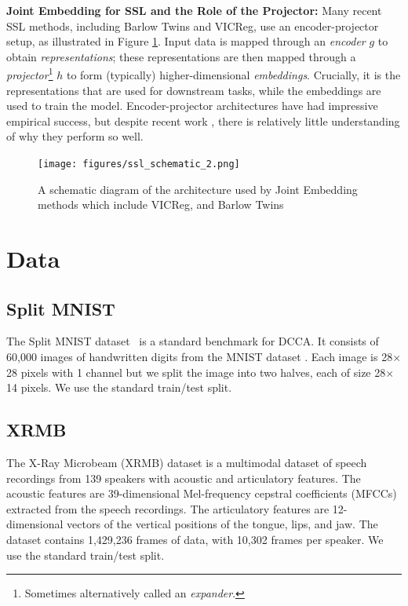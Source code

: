 \textbf{Joint Embedding for SSL and the Role of the Projector:} Many recent SSL methods, including Barlow Twins and VICReg, use an encoder-projector setup, as illustrated in Figure \ref{fig:sslschematic}. Input data is mapped through an \textit{encoder} \( g \) to obtain \textit{representations}; these representations are then mapped through a \textit{projector}\footnote{Sometimes alternatively called an \textit{expander}.} \( h \) to form (typically) higher-dimensional \textit{embeddings}. Crucially, it is the representations that are used for downstream tasks, while the embeddings are used to train the model. Encoder-projector architectures have had impressive empirical success, but despite recent work \cite{ma2023deciphering, jing2021understanding}, there is relatively little understanding of why they perform so well.

\begin{figure}[H]
    \centering
    \texttt{[image: figures/ssl\_schematic\_2.png]}
    \caption{A schematic diagram of the architecture used by Joint Embedding methods which include VICReg, and Barlow Twins}
    \label{fig:sslschematic}
\end{figure}

\section{Data}

\subsection{Split MNIST}
The Split MNIST dataset~\cite{wang2015stochastic} is a standard benchmark for DCCA. It consists of 60,000 images of handwritten digits from the MNIST dataset \cite{lecun1998gradient}. Each image is 28$\times$28 pixels with 1 channel but we split the image into two halves, each of size 28$\times$14 pixels. We use the standard train/test split.

\subsection{XRMB}
The X-Ray Microbeam (XRMB) dataset \cite{westbury1994x} is a multimodal dataset of speech recordings from 139 speakers with acoustic and articulatory features. The acoustic features are 39-dimensional Mel-frequency cepstral coefficients (MFCCs) extracted from the speech recordings. The articulatory features are 12-dimensional vectors of the vertical positions of the tongue, lips, and jaw. The dataset contains 1,429,236 frames of data, with 10,302 frames per speaker. We use the standard train/test split.

